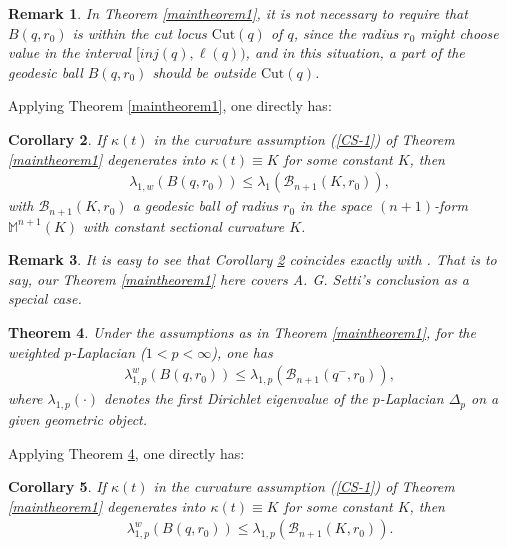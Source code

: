 \documentclass[12pt]{article}
\newtheorem{theorem}{Theorem}[section]
\newtheorem{corollary}[theorem]{Corollary}
\newtheorem{remark}[theorem]{Remark}
\begin{document}
\begin{remark}
\rm{ In Theorem \ref{maintheorem1}, it is not necessary to require
that $B(q,r_0)$ is within the cut locus $\mathrm{Cut}(q)$ of $q$,
since the radius $r_0$ might choose value in the interval $
[inj(q),\ell(q))$, and in this situation, a part of the geodesic
ball $B(q,r_0)$ should be outside $\mathrm{Cut}(q)$. }
\end{remark}

Applying Theorem \ref{maintheorem1}, one directly has:

\begin{corollary} \label{coro-1}
 If $\kappa(t)$ in the curvature assumption (\ref{CS-1}) of Theorem
 \ref{maintheorem1} degenerates into $\kappa(t)\equiv K$ for some
 constant $K$, then
\begin{eqnarray} \label{ECT-6}
\lambda_{1,w}(B(q,r_0))\leq\lambda_{1}(\mathcal{B}_{n+1}(K,r_0)),
\end{eqnarray}
with $\mathcal{B}_{n+1}(K,r_0)$ a geodesic ball of radius $r_0$ in
the space $(n+1)$-form $\mathbb{M}^{n+1}(K)$ with constant sectional
curvature $K$.
\end{corollary}


\begin{remark}
\rm{ It is easy to see that Corollary \ref{coro-1} coincides exactly
with \cite[Theorem 4.2]{SAG}. That is to say, our Theorem
\ref{maintheorem1} here covers A. G. Setti's conclusion
\cite[Theorem 4.2]{SAG} as a special case. }
\end{remark}



\begin{theorem} \label{maintheorem2}
Under the assumptions as in Theorem  \ref{maintheorem1}, for the
weighted $p$-Laplacian ($1<p<\infty$), one has
\begin{eqnarray}  \label{ECT-7}
\lambda_{1,p}^{w}(B(q,r_0))\leq\lambda_{1,p}(\mathscr{B}_{n+1}(q^{-},r_0)),
\end{eqnarray}
 where  $\lambda_{1,p}(\cdot)$ denotes the
first Dirichlet eigenvalue of the $p$-Laplacian $\Delta_{p}$ on a
given geometric object.
\end{theorem}

Applying Theorem \ref{maintheorem2}, one directly has:

\begin{corollary} \label{coro-2}
If $\kappa(t)$ in the curvature assumption (\ref{CS-1}) of Theorem
 \ref{maintheorem1} degenerates into $\kappa(t)\equiv K$ for some
 constant $K$, then
  \begin{eqnarray} \label{ECT-8}
\lambda_{1,p}^{w}(B(q,r_0))\leq\lambda_{1,p}(\mathcal{B}_{n+1}(K,r_0)).
\end{eqnarray}
\end{corollary}
\end{document}
